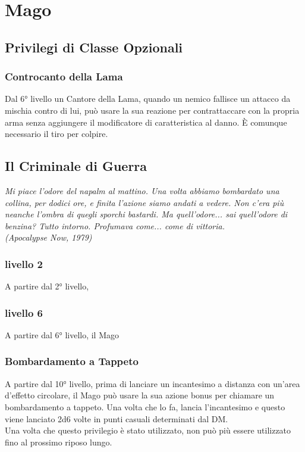 \chapter{Mago}

\section{Privilegi di Classe Opzionali}

\subsection{Controcanto della Lama}

Dal 6° livello un Cantore della Lama, quando un nemico fallisce un attacco da mischia contro di lui, può usare la sua reazione per contrattaccare con la propria arma senza aggiungere il modificatore di caratteristica al danno. È comunque necessario il tiro per colpire.

\section{Il Criminale di Guerra}

\begin{DndReadAloud}
    \it
    Mi piace l'odore del napalm al mattino. Una volta abbiamo bombardato una collina, per dodici ore, e finita l'azione siamo andati a vedere. Non c'era più neanche l'ombra di quegli sporchi bastardi. Ma quell'odore... sai quell'odore di benzina? Tutto intorno. Profumava come... come di vittoria.\\ (Apocalypse Now, 1979)
\end{DndReadAloud}

\subsection{livello 2}
A partire dal 2° livello, 

\subsection{livello 6}
A partire dal 6° livello, il Mago 

\subsection{Bombardamento a Tappeto}
A partire dal 10° livello, prima di lanciare un incantesimo a distanza con un'area d'effetto circolare, il Mago può usare la sua azione bonus per chiamare un bombardamento a tappeto. Una volta che lo fa, lancia l'incantesimo e questo viene lanciato 2d6 volte in punti casuali determinati dal DM.\\ Una volta che questo privilegio è stato utilizzato, non può più essere utilizzato fino al prossimo riposo lungo.

